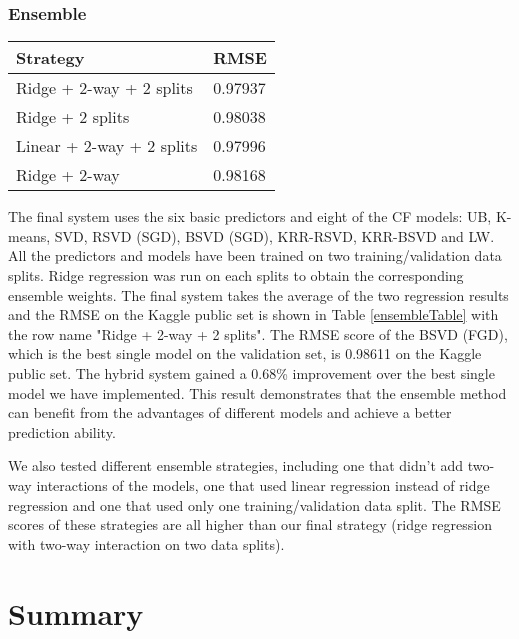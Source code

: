 \documentclass[10pt,conference,compsocconf]{IEEEtran}
\begin{document}
\subsubsection{Ensemble}
\begin{table*}[htbp]
  \centering
  \begin{tabular}[c]{|l||l|}
    \hline
    Strategy&RMSE\\
    \hline
    Ridge + 2-way + 2 splits&0.97937\\
    Ridge + 2 splits&0.98038\\
    Linear + 2-way + 2 splits&0.97996\\
    Ridge + 2-way&0.98168\\
    \hline
  \end{tabular}
    \caption{  \label{ensembleTable} RMSE of Different Ensemble Strategies on Kaggle Public Set}
\end{table*}

The final system uses the six basic predictors and eight of the CF models: UB, K-means, SVD, RSVD (SGD), BSVD (SGD), KRR-RSVD, KRR-BSVD and LW. All the predictors and models have been trained on two training/validation data splits. Ridge regression was run on each splits to obtain the corresponding ensemble weights. The final system takes the average of the two regression results and the RMSE on the Kaggle public set is shown in Table \ref{ensembleTable} with the row name "Ridge + 2-way + 2 splits". The RMSE score of the BSVD (FGD), which is the best single model on the validation set, is 0.98611 on the Kaggle public set. The hybrid system gained a 0.68\% improvement over the best single model we have implemented. This result demonstrates that the ensemble method can benefit from the advantages of different models and achieve a better prediction ability.

We also tested different ensemble strategies, including one that didn't add two-way interactions of the models, one that used linear regression instead of ridge regression and one that used only one training/validation data split. The RMSE scores of these strategies are all higher than our final strategy (ridge regression with two-way interaction on two data splits).

\section{Summary}
\end{document}
